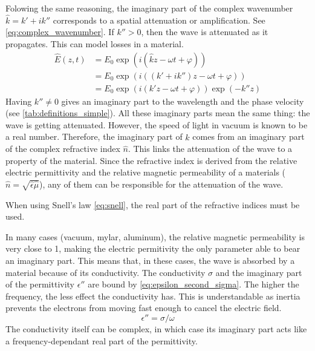 Folowing the same reasoning, the imaginary part of the complex wavenumber $\hat{k} = k' + i k''$ corresponds to a spatial attenuation or amplification.
See \cref{eq:complex_wavenumber}.
If $k''> 0$, then the wave is attenuated as it propagates.
This can model losses in a material.
\begin{subequations}
    \begin{align}
       \hat{E}(z, t) &=
       E_0 \exp(i(\hat{k}z - \omega t + \varphi))
       \\
       &=
       E_0 \exp(i((k' + i k'')z - \omega t + \varphi))
       \\
       &=
       E_0 \exp(i(k' z - \omega t + \varphi)) \exp(-k'' z)
    \end{align}
    \label{eq:complex_wavenumber}
\end{subequations}
Having $k'' \ne 0$ gives an imaginary part to the wavelength and the phase velocity
(see \cref{tab:definitions_simple}).
All these imaginary parts mean the same thing: the wave is getting attenuated.
However, the speed of light in vacuum is known to be a real number.
Therefore, the imaginary part of $\hat{k}$ comes from an imaginary part of the complex refractive index $\hat{n}$.
This links the attenuation of the wave to a property of the material.
Since the refractive index is derived from the relative electric permittivity and the relative magnetic permeability of a materials
($\hat{n}=\sqrt{\hat{\epsilon}\hat{\mu}}$),
any of them can be responsible for the attenuation of the wave.

When using Snell's law \eqref{eq:snell}, the real part of the refractive indices must be used.

In many cases (vacuum, mylar, aluminum), the relative magnetic permeability is very close to 1, making the electric permitivity the only parameter able to bear an imaginary part.
This means that, in these cases, the wave is absorbed by a material because of its conductivity.
The conductivity $\sigma$ and the imaginary part of the permittivity $\epsilon''$ are bound by \cref{eq:epsilon_second_sigma}.
The higher the frequency, the less effect the conductivity has.
This is understandable as inertia prevents the electrons from moving fast enough to cancel the electric field.
\begin{equation}   
    \epsilon'' = \sigma / \omega
    \label{eq:epsilon_second_sigma}
\end{equation}
The conductivity itself can be complex, in which case its imaginary part acts like a frequency-dependant real part of the permittivity.

